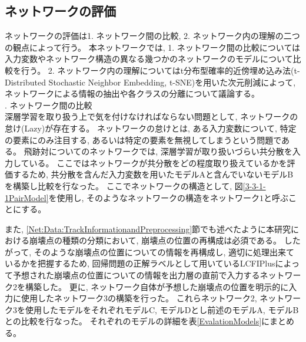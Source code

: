 \subsection{ネットワークの評価} \label{Net:PM:PerformanceofPM}

ネットワークの評価は1. ネットワーク間の比較, 2. ネットワーク内の理解の二つの観点によって行う。
本ネットワークでは, 1. ネットワーク間の比較については入力変数やネットワーク構造の異なる幾つかのネットワークのモデルについて比較を行う。
2. ネットワーク内の理解についてはt分布型確率的近傍埋め込み法(t-Distributed Stochastic Neighbor Embedding, t-SNE\cite{t-SNEpaper})を用いた次元削減によって, ネットワークによる情報の抽出や各クラスの分離について議論する。\\
. ネットワーク間の比較\\

深層学習を取り扱う上で気を付けなければならない問題として, ネットワークの怠け(Lazy)が存在する。
ネットワークの怠けとは, ある入力変数について, 特定の要素にのみ注目する, あるいは特定の要素を無視してしまうという問題である。
飛跡対についてのネットワークでは, 深層学習が取り扱いづらい共分散を入力している。
ここではネットワークが共分散をどの程度取り扱えているかを評価するため, 共分散を含んだ入力変数を用いたモデルAと含んでいないモデルBを構築し比較を行なった。
ここでネットワークの構造として, 図\ref{3-3-1-1PairModel}を使用し, そのようなネットワークの構造をネットワーク$1$と呼ぶことにする。

また, \ref{Net:Data:TrackInformationandPreprocessing}節でも述べたように本研究における崩壊点の種類の分類において, 崩壊点の位置の再構成は必須である。
したがって, そのような崩壊点の位置についての情報を再構成し, 適切に処理出来ているかを把握するため, 回帰問題の正解ラベルとして用いているLCFIPlusによって予想された崩壊点の位置についての情報を出力層の直前で入力するネットワーク2を構築した。
更に, ネットワーク自体が予想した崩壊点の位置を明示的に入力に使用したネットワーク3の構築を行った。
これらネットワーク2, ネットワーク3を使用したモデルをそれぞれモデルC, モデルDとし前述のモデルA, モデルBとの比較を行なった。
それぞれのモデルの詳細を表\ref{EvalationModels}にまとめる。

